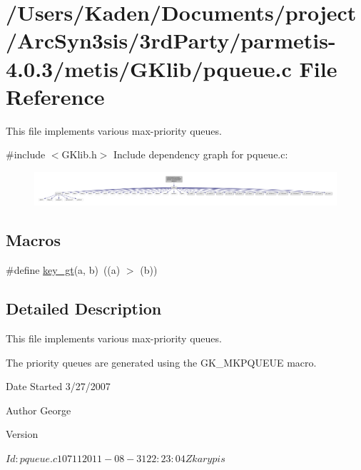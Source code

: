 \hypertarget{a00128}{}\section{/\+Users/\+Kaden/\+Documents/project/\+Arc\+Syn3sis/3rd\+Party/parmetis-\/4.0.3/metis/\+G\+Klib/pqueue.c File Reference}
\label{a00128}


This file implements various max-\/priority queues.  


{\ttfamily \#include $<$G\+Klib.\+h$>$}\newline
Include dependency graph for pqueue.\+c\+:\nopagebreak
\begin{figure}[H]
\begin{center}
\leavevmode
\includegraphics[width=350pt]{a00129}
\end{center}
\end{figure}
\subsection*{Macros}
\begin{DoxyCompactItemize}
\item 
\#define \hyperlink{a00128_a89b02dbc0bd6ec64351eff7c65c6440e}{key\+\_\+gt}(a,  b)~((a) $>$ (b))
\end{DoxyCompactItemize}


\subsection{Detailed Description}
This file implements various max-\/priority queues. 

The priority queues are generated using the G\+K\+\_\+\+M\+K\+P\+Q\+U\+E\+UE macro.

\begin{DoxyDate}{Date}
Started 3/27/2007 
\end{DoxyDate}
\begin{DoxyAuthor}{Author}
George 
\end{DoxyAuthor}
\begin{DoxyVersion}{Version}
\begin{DoxyVerb}$Id: pqueue.c 10711 2011-08-31 22:23:04Z karypis $ \end{DoxyVerb}
 
\end{DoxyVersion}


